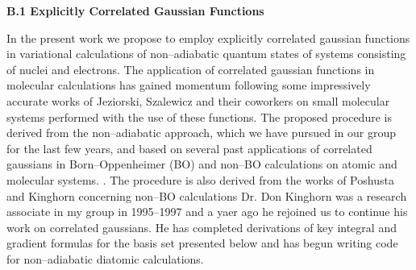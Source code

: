{{{\bf B.1 Explicitly Correlated Gaussian Functions}

In the present work we propose to employ explicitly correlated
gaussian functions in variational calculations of 
non--adiabatic quantum states of systems 
consisting of nuclei and electrons.
The application of correlated gaussian functions in
molecular calculations has gained momentum
following some impressively accurate 
works of Jeziorski, Szalewicz and
their coworkers on small molecular systems performed
with the use of these functions.
\cite{sz1}
The proposed procedure is derived from
the non--adiabatic approach, which we have pursued in our group
for the last few years, and based on several past applications
of correlated gaussians in Born--Oppenheimer (BO) 
and non--BO calculations on atomic
and molecular systems.
\cite{A2,A3,A6,A8,%
A14,%
A16,%
A20,A21,%
A27,%
A37,%
A38,A382,A383,%
kozlowski91,kozlowski92a,kozlowski92b,kozlowski92c}.
The procedure is also derived from the works 
of Poshusta and Kinghorn
concerning non--BO calculations
\cite{Poshusta83,Kinghorn93,Kinghorn95b}
Dr. Don Kinghorn was a research associate 
in my group in 1995--1997 and a yaer ago he 
rejoined us to continue his work on correlated
gaussians. He has completed derivations of key integral and
gradient formulas for the basis set presented below and has begun
writing code for non--adiabatic diatomic calculations. 

}}
